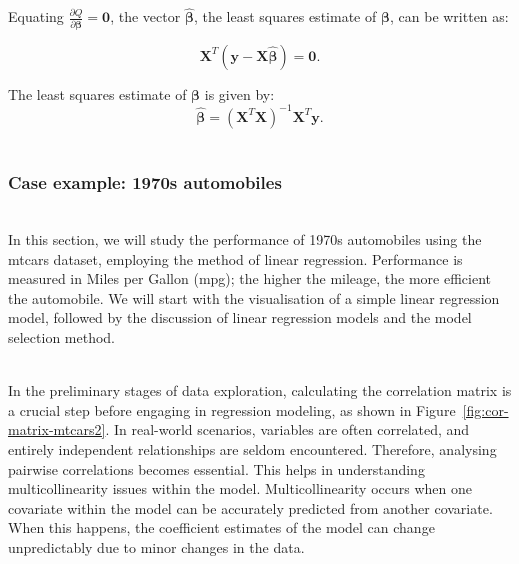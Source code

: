 \documentclass{article}\usepackage[]{graphicx}\usepackage[]{xcolor}
\numberwithin{equation}{section}
\begin{document}
\noindent
Equating $\frac{\partial Q}{\partial \boldsymbol{\beta}} = \mathbf{0}$, the vector $\hat{\boldsymbol{\beta}}$, the least squares estimate of $\boldsymbol{\beta}$, can be written as:

\begin{equation}\label{eq:4-5}
\mathbf{X}^T(\mathbf{y}-\mathbf{X}\hat{\boldsymbol{\beta}})=\mathbf{0}.
\end{equation}

\noindent 
The least squares estimate of $\boldsymbol{\beta}$ is given by:
\begin{equation}\label{eq:4-6}
\hat{\boldsymbol{\beta}} = (\mathbf{X}^T\mathbf{X})^{-1}\mathbf{X}^T\mathbf{y}.
\end{equation}
\\ 
\noident 
\subsubsection{Case example: 1970s automobiles}\\
\noindent In this section, we will study the performance of 1970s automobiles using the mtcars dataset, employing the method of linear regression. Performance is measured in Miles per Gallon (mpg); the higher the mileage, the more efficient the automobile. We will start with the visualisation of a simple linear regression model, followed by the discussion of linear regression models and the model selection method.

\noindent
\\In the preliminary stages of data exploration, calculating the correlation matrix is a crucial step before engaging in regression modeling, as shown in Figure~\ref{fig:cor-matrix-mtcars2}. In real-world scenarios, variables are often correlated, and entirely independent relationships are seldom encountered. Therefore, analysing pairwise correlations becomes essential. This helps in understanding multicollinearity issues within the model. Multicollinearity occurs when one covariate within the model can be accurately predicted from another covariate. When this happens, the coefficient estimates of the model can change unpredictably due to minor changes in the data.\\
\end{document}
